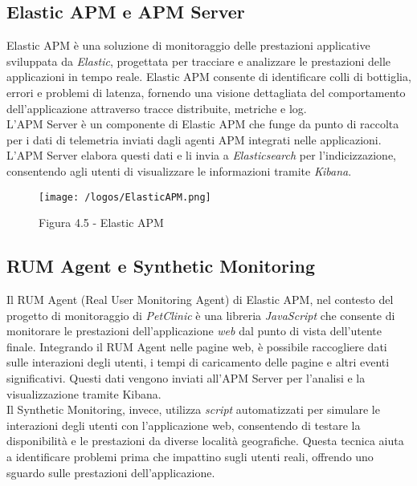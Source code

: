 \vspace{1em}

\subsection*{Elastic APM e APM Server}
Elastic APM è una soluzione di monitoraggio delle prestazioni applicative sviluppata da \emph{Elastic}, progettata per tracciare e analizzare le prestazioni delle applicazioni in tempo reale. Elastic APM consente di identificare colli di bottiglia, errori e problemi di latenza, fornendo una visione dettagliata del comportamento dell'applicazione attraverso tracce distribuite, metriche e log. \\
L'APM Server è un componente di Elastic APM che funge da punto di raccolta per i dati di telemetria inviati dagli agenti APM integrati nelle applicazioni. L'APM Server elabora questi dati e li invia a \emph{Elasticsearch} per l'indicizzazione, consentendo agli utenti di visualizzare le informazioni tramite \emph{Kibana}.
\begin{figure}[H] 
    \centering 
    \texttt{[image: /logos/ElasticAPM.png]} 
    \caption{Figura 4.5 - Elastic APM}
\end{figure}

\vspace{1em}

\subsection*{RUM Agent e Synthetic Monitoring}
Il RUM Agent (Real User Monitoring Agent) di Elastic APM, nel contesto del progetto di monitoraggio di \emph{PetClinic} è una libreria \emph{JavaScript} che consente di monitorare le prestazioni dell'applicazione \emph{web} dal punto di vista dell'utente finale. Integrando il RUM Agent nelle pagine web, è possibile raccogliere dati sulle interazioni degli utenti, i tempi di caricamento delle pagine e altri eventi significativi. Questi dati vengono inviati all'APM Server per l'analisi e la visualizzazione tramite Kibana. \\
Il Synthetic Monitoring, invece, utilizza \emph{script} automatizzati per simulare le interazioni degli utenti con l'applicazione web, consentendo di testare la disponibilità e le prestazioni da diverse località geografiche. Questa tecnica aiuta a identificare problemi prima che impattino sugli utenti reali, offrendo uno sguardo sulle prestazioni dell'applicazione.


\newpage
